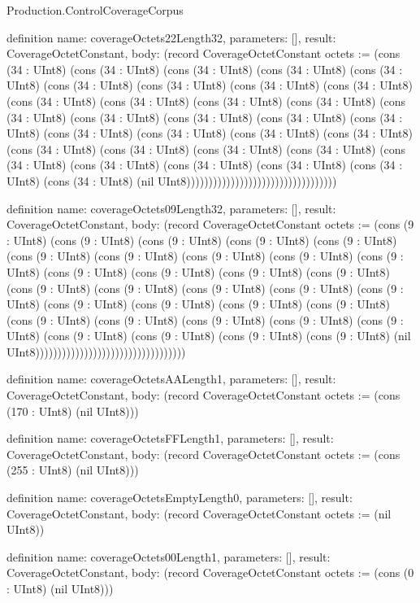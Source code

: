 \begin{lexlean}{Production.ControlCoverageCorpus}
\begin{semanticmodule}
definition{
  name: coverageOctets22Length32,
  parameters: [],
  result: CoverageOctetConstant,
  body: (record CoverageOctetConstant {octets := (cons (34 : UInt8) (cons (34 : UInt8) (cons (34 : UInt8) (cons (34 : UInt8) (cons (34 : UInt8) (cons (34 : UInt8) (cons (34 : UInt8) (cons (34 : UInt8) (cons (34 : UInt8) (cons (34 : UInt8) (cons (34 : UInt8) (cons (34 : UInt8) (cons (34 : UInt8) (cons (34 : UInt8) (cons (34 : UInt8) (cons (34 : UInt8) (cons (34 : UInt8) (cons (34 : UInt8) (cons (34 : UInt8) (cons (34 : UInt8) (cons (34 : UInt8) (cons (34 : UInt8) (cons (34 : UInt8) (cons (34 : UInt8) (cons (34 : UInt8) (cons (34 : UInt8) (cons (34 : UInt8) (cons (34 : UInt8) (cons (34 : UInt8) (cons (34 : UInt8) (cons (34 : UInt8) (cons (34 : UInt8) (nil UInt8)))))))))))))))))))))))))))))))))})
}

definition{
  name: coverageOctets09Length32,
  parameters: [],
  result: CoverageOctetConstant,
  body: (record CoverageOctetConstant {octets := (cons (9 : UInt8) (cons (9 : UInt8) (cons (9 : UInt8) (cons (9 : UInt8) (cons (9 : UInt8) (cons (9 : UInt8) (cons (9 : UInt8) (cons (9 : UInt8) (cons (9 : UInt8) (cons (9 : UInt8) (cons (9 : UInt8) (cons (9 : UInt8) (cons (9 : UInt8) (cons (9 : UInt8) (cons (9 : UInt8) (cons (9 : UInt8) (cons (9 : UInt8) (cons (9 : UInt8) (cons (9 : UInt8) (cons (9 : UInt8) (cons (9 : UInt8) (cons (9 : UInt8) (cons (9 : UInt8) (cons (9 : UInt8) (cons (9 : UInt8) (cons (9 : UInt8) (cons (9 : UInt8) (cons (9 : UInt8) (cons (9 : UInt8) (cons (9 : UInt8) (cons (9 : UInt8) (cons (9 : UInt8) (nil UInt8)))))))))))))))))))))))))))))))))})
}

definition{
  name: coverageOctetsAALength1,
  parameters: [],
  result: CoverageOctetConstant,
  body: (record CoverageOctetConstant {octets := (cons (170 : UInt8) (nil UInt8))})
}

definition{
  name: coverageOctetsFFLength1,
  parameters: [],
  result: CoverageOctetConstant,
  body: (record CoverageOctetConstant {octets := (cons (255 : UInt8) (nil UInt8))})
}

definition{
  name: coverageOctetsEmptyLength0,
  parameters: [],
  result: CoverageOctetConstant,
  body: (record CoverageOctetConstant {octets := (nil UInt8)})
}

definition{
  name: coverageOctets00Length1,
  parameters: [],
  result: CoverageOctetConstant,
  body: (record CoverageOctetConstant {octets := (cons (0 : UInt8) (nil UInt8))})
}


\end{semanticmodule}
\end{lexlean}
